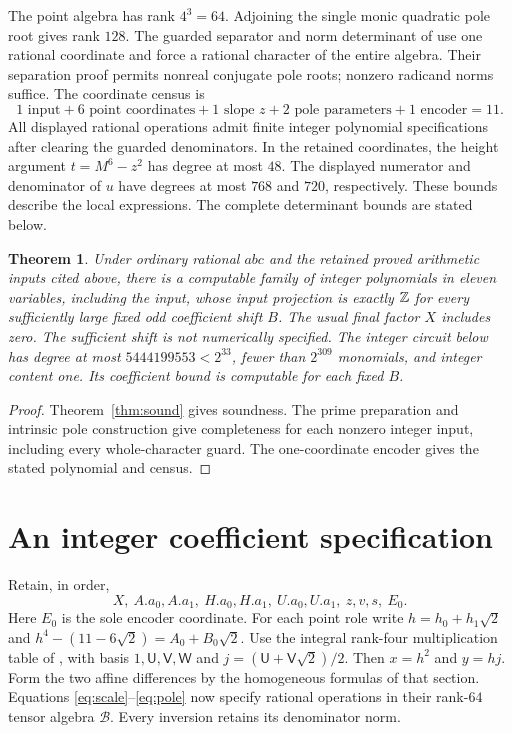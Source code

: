 \documentclass[11pt,a4paper]{article}
\newtheorem{theorem}{Theorem}[section]
\begin{document}
The point algebra has rank $4^3=64$. Adjoining the single monic
quadratic pole root gives rank $128$. The guarded separator and norm
determinant of \cite{Unit} use one rational coordinate and force a
rational character of the entire algebra. Their separation proof
permits nonreal conjugate pole roots; nonzero radicand norms suffice.
The coordinate census is
\[
 1\text{ input}+6\text{ point coordinates}+1\text{ slope }z
                 +2\text{ pole parameters}+1\text{ encoder}=11.
\]
All displayed rational operations admit finite integer polynomial
specifications after clearing the guarded denominators.
In the retained coordinates, the height argument $t=M^6-z^2$ has
degree at most $48$. The displayed numerator and denominator of $u$
have degrees at most $768$ and $720$, respectively. These bounds describe the local expressions. The complete determinant
bounds are stated below.

\begin{theorem}\label{thm:eleven}
Under ordinary rational $abc$ and the retained proved arithmetic
inputs cited above, there is a computable family of integer polynomials
in eleven variables, including the input, whose input projection is
exactly $\mathbb Z$ for every sufficiently large fixed odd coefficient shift
$B$. The usual final factor $X$ includes zero. The sufficient shift
is not numerically specified. The integer circuit below has degree at
most $5444199553<2^{33}$, fewer than $2^{309}$ monomials, and
integer content one. Its coefficient bound is computable for each fixed $B$.
\end{theorem}
\begin{proof}
Theorem~\ref{thm:sound} gives soundness. The prime preparation and
intrinsic pole construction give completeness for each nonzero integer
input, including every whole-character guard. The one-coordinate
encoder gives the stated polynomial and census.
\end{proof}


\section{An integer coefficient specification}

Retain, in order,
\[
 X,\ A.a_0,A.a_1,\ H.a_0,H.a_1,\ U.a_0,U.a_1,\ z,v,s,\ E_0.
\]
Here $E_0$ is the sole encoder coordinate. For each point role write
$h=h_0+h_1\sqrt2$ and $h^4-(11-6\sqrt2)=A_0+B_0\sqrt2$.
Use the integral rank-four multiplication table of \cite[Section 2]{Unit},
with basis $1,\mathsf U,\mathsf V,\mathsf W$ and
$j=(\mathsf U+\mathsf V\sqrt2)/2$. Then $x=h^2$ and $y=hj$.
Form the two affine differences by the homogeneous formulas of that
section. Equations \eqref{eq:scale}--\eqref{eq:pole} now specify
rational operations in their rank-$64$ tensor algebra $\mathcal B$.
Every inversion retains its denominator norm.
\end{document}
